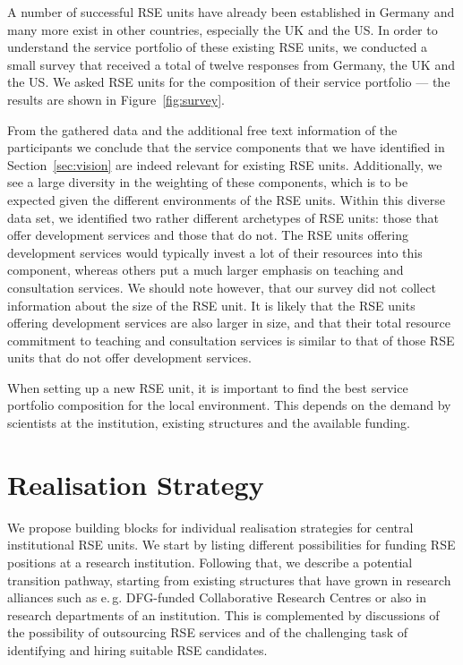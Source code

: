 \documentclass[a4paper]{article}
\makeatletter
\newcommand*{\eg}{e.\,g.\@\xspace}
\makeatother
\begin{document}
A number of successful RSE units have already been established in Germany and many more exist in other countries, especially the UK and the US\@.
In order to understand the service portfolio of these existing RSE units, we conducted a small survey that received a total of twelve responses from Germany, the UK and the US\@.
We asked RSE units for the composition of their service portfolio --- the results are shown in Figure~\ref{fig:survey}.

From the gathered data and the additional free text information of the participants we conclude that the service components that we have identified in Section~\ref{sec:vision} are indeed relevant for existing RSE units.
Additionally, we see a large diversity in the weighting of these components, which is to be expected given the different environments of the RSE units.
Within this diverse data set, we identified two rather different archetypes of RSE units: those that offer development services and those that do not.
The RSE units offering development services would typically invest a lot of their resources into this component, whereas others put a much larger emphasis on teaching and consultation services.
We should note however, that our survey did not collect information about the size of the RSE unit.
It is likely that the RSE units offering development services are also larger in size,
and that their total resource commitment to teaching and consultation services is similar to that of those RSE units that do not offer development services.

When setting up a new RSE unit, it is important to find the best service portfolio composition for the local environment.
This depends on the demand by scientists at the institution, existing structures and the available funding.

\section{Realisation Strategy}%
\label{sec:realization}

We propose building blocks for individual realisation strategies for central institutional RSE units.
We start by listing different possibilities for funding RSE positions at a research institution.
Following that, we describe a potential transition pathway, starting from existing structures that have grown in research alliances such as \eg{} DFG-funded Collaborative Research Centres or also in research departments of an institution.
This is complemented by discussions of the possibility of outsourcing RSE services and of the challenging task of identifying and hiring suitable RSE candidates.
\end{document}
